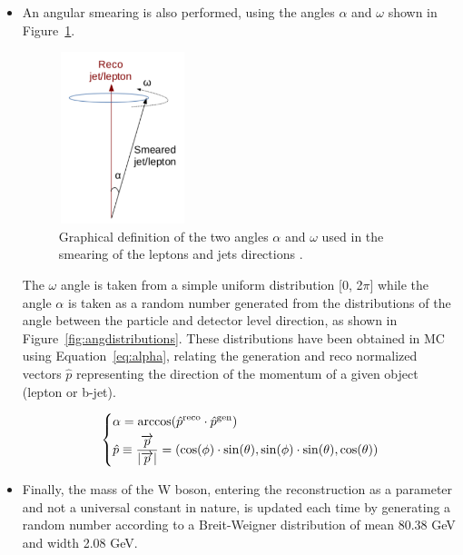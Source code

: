 \documentclass[a4paper, 10pt, openright]{report}
\begin{document}
\begin{itemize}
\item An angular smearing is also performed, using the angles $\alpha$ and $\omega$ shown in Figure~\ref{fig:angsmearing}. 

\begin{figure}[htbp]
\centering
\includegraphics[width=3.7cm, height=5cm]{figs/angularSmearing.png}
\caption{Graphical definition of the two angles $\alpha$ and $\omega$ used in the smearing of the leptons and jets directions \cite{DESYAN}.}
\label{fig:angsmearing}
\end{figure}

The $\omega$ angle is taken from a simple uniform distribution [0, 2$\pi$] while the angle $\alpha$ is taken as a random number generated from the distributions of the angle between the particle and detector level direction, as shown in Figure~\ref{fig:angdistributions}. These distributions have been obtained in \ac{MC} using Equation~\ref{eq:alpha}, relating the generation and reco normalized vectors $\hat{p}$ representing the direction of the momentum of a given object (lepton or b-jet).

\begin{equation}
\label{eq:alpha}
\begin{dcases}
\alpha = \arccos(\hat{p}^{\text{reco}} \cdot \hat{p}^{\text{gen}}) \\
\hat{p} \equiv \frac{\overrightarrow{p}}{|\overrightarrow{p}|} = (\cos(\phi) \cdot \sin(\theta), \sin(\phi) \cdot \sin(\theta), \cos(\theta))
\end{dcases}
\end{equation}

\item Finally, the mass of the W boson, entering the reconstruction as a parameter and not a universal constant in nature, is updated each time by generating a random number according to a Breit-Weigner distribution of mean 80.38 GeV and width 2.08 GeV.
\end{itemize}
\end{document}
